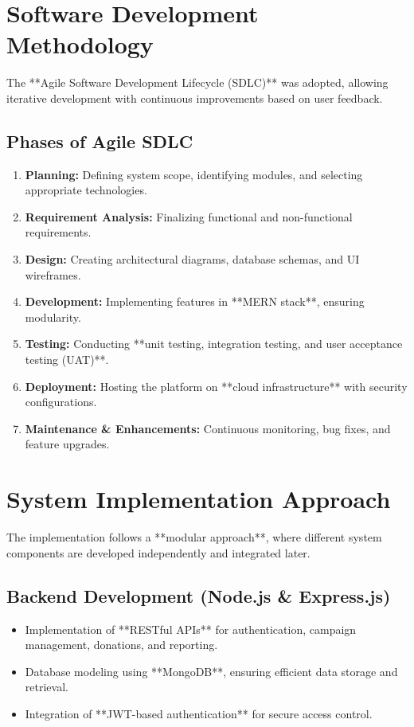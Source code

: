 \section{Software Development Methodology}
The **Agile Software Development Lifecycle (SDLC)** was adopted, allowing iterative development with continuous improvements based on user feedback.

\subsection{Phases of Agile SDLC}
\begin{enumerate}
    \item \textbf{Planning:} Defining system scope, identifying modules, and selecting appropriate technologies.
    \item \textbf{Requirement Analysis:} Finalizing functional and non-functional requirements.
    \item \textbf{Design:} Creating architectural diagrams, database schemas, and UI wireframes.
    \item \textbf{Development:} Implementing features in **MERN stack**, ensuring modularity.
    \item \textbf{Testing:} Conducting **unit testing, integration testing, and user acceptance testing (UAT)**.
    \item \textbf{Deployment:} Hosting the platform on **cloud infrastructure** with security configurations.
    \item \textbf{Maintenance & Enhancements:} Continuous monitoring, bug fixes, and feature upgrades.
\end{enumerate}

\section{System Implementation Approach}
The implementation follows a **modular approach**, where different system components are developed independently and integrated later.

\subsection{Backend Development (Node.js & Express.js)}
\begin{itemize}
    \item Implementation of **RESTful APIs** for authentication, campaign management, donations, and reporting.
    \item Database modeling using **MongoDB**, ensuring efficient data storage and retrieval.
    \item Integration of **JWT-based authentication** for secure access control.
\end{itemize}


